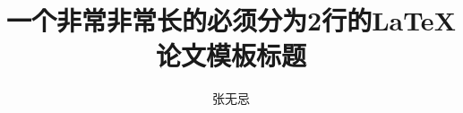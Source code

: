\documentclass[oneside,UTF8,AutoFakeBold=2]{cuzthesis} %
\title{一个非常非常长的必须分为2行的\LaTeX 论文模板标题} %
\author{张无忌}              %
\institute{新媒体学院}		%
\begin{document}
\maketitle

\abstractmatter



\frontmatter
\tableofcontents %
\listoffigures   %
\listoftables    %
%

\mainmatter



\backmatter



%




\end{document}
